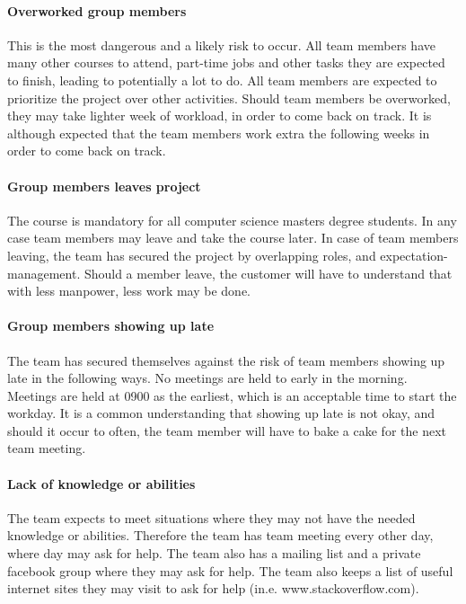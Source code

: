 \paragraph{Overworked group members}
This is the most dangerous and a likely risk to occur. All team members have many other 
courses to attend, part-time jobs and other tasks they are expected to finish, leading 
to potentially a lot to do. All team members are expected to prioritize the project over 
other activities. Should team members be overworked, they may take lighter week of  workload, 
in order to come back on track. It is although expected that the team members work extra 
the following weeks in order to come back on track. 

\paragraph{Group members leaves project}
The course is mandatory for all computer science masters degree students. In any case team 
members may leave and take the course later. In case of team members leaving, the team 
has secured the project by overlapping roles, and expectation-management. Should a member 
leave, the customer will have to understand that with less manpower, less work may be done. 


\paragraph{Group members showing up late}
The team has secured themselves against the risk of team members showing up late in the 
following ways. No meetings are held to early in the morning. Meetings are held at 0900 
as the earliest, which is an acceptable time to start the workday. It is a common understanding 
that showing up late is not okay, and should it occur to often, the team member will have 
to bake a cake for the next team meeting. 


\paragraph{Lack of knowledge or abilities}
The team expects to meet situations where they may not have the needed knowledge or abilities. 
Therefore the team has team meeting every other day, where day may ask for help. The team also 
has a mailing list and a private facebook group where they may ask for help. The team also 
keeps a list of useful internet sites they may visit to ask for help (in.e. www.stackoverflow.com). \\ \\


